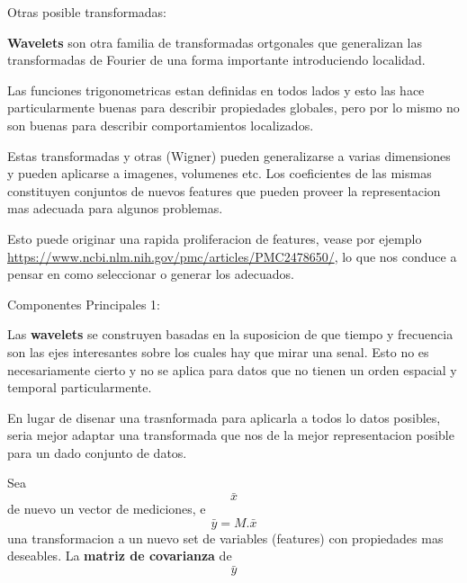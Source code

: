\documentclass[ignorenonframetext,]{beamer}
\begin{document}
\begin{frame}

\begin{block}{Otras posible transformadas:}

\textbf{Wavelets} son otra familia de transformadas ortgonales que
generalizan las transformadas de Fourier de una forma importante
introduciendo localidad.

Las funciones trigonometricas estan definidas en todos lados y esto las
hace particularmente buenas para describir propiedades globales, pero
por lo mismo no son buenas para describir comportamientos localizados.

Estas transformadas y otras (Wigner) pueden generalizarse a varias
dimensiones y pueden aplicarse a imagenes, volumenes etc. Los
coeficientes de las mismas constituyen conjuntos de nuevos features que
pueden proveer la representacion mas adecuada para algunos problemas.

Esto puede originar una rapida proliferacion de features, vease por
ejemplo \url{https://www.ncbi.nlm.nih.gov/pmc/articles/PMC2478650/}, lo
que nos conduce a pensar en como seleccionar o generar los adecuados.

\end{block}

\end{frame}

\begin{frame}

\begin{block}{Componentes Principales 1:}

Las \textbf{wavelets} se construyen basadas en la suposicion de que
tiempo y frecuencia son las ejes interesantes sobre los cuales hay que
mirar una senal. Esto no es necesariamente cierto y no se aplica para
datos que no tienen un orden espacial y temporal particularmente.

En lugar de disenar una trasnformada para aplicarla a todos lo datos
posibles, seria mejor adaptar una transformada que nos de la mejor
representacion posible para un dado conjunto de datos.

Sea \[\bar{x}\] de nuevo un vector de mediciones, e
\[\bar{y}=M.\bar{x}\] una transformacion a un nuevo set de variables
(features) con propiedades mas deseables. La \textbf{matriz de
covarianza} de \[\bar{y}\]

\end{block}

\end{frame}
\end{document}
